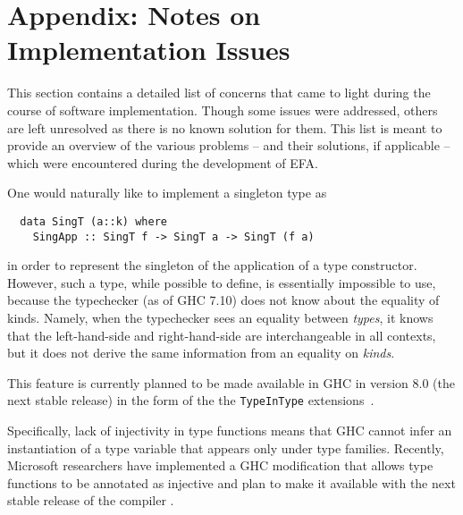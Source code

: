 \chapter*{Appendix: Notes on Implementation Issues}

This section contains a detailed list of concerns that came to light during the
course of software implementation. Though some issues were addressed, others are
left unresolved as there is no known solution for them. This list is meant to
provide an overview of the various problems -- and their solutions, if
applicable -- which were encountered during the development of EFA. 

\begin{description}[leftmargin=1em]
\item[No kind equality] 
  One would naturally like to implement a singleton type as
  \begin{lstlisting}
  data SingT (a::k) where
    SingApp :: SingT f -> SingT a -> SingT (f a) 
  \end{lstlisting}
  in order to represent the singleton of the application of a type
  constructor.  However, such a type, while possible to define, is essentially
  impossible to use, because the typechecker (as of GHC 7.10) does not know
  about the equality of kinds. Namely, when the typechecker sees an equality
  between \emph{types}, it knows that the left-hand-side and right-hand-side
  are interchangeable in all contexts, but it does not derive the same
  information from an equality on \emph{kinds}.
  
  This feature is currently planned to be made available in GHC in version 8.0
  (the next stable release) in the form of the the \texttt{TypeInType}
  extensions~\cite{typeintype}.

\item[Non-injective type families] 
  Specifically, lack of injectivity in type functions means that GHC cannot infer
  an instantiation of a type variable that appears only under type
  families. Recently, Microsoft researchers have implemented a GHC modification
  that allows type functions to be annotated as injective and plan to make it
  available with the next stable release of the compiler \cite{microsoft}.


\end{description}
